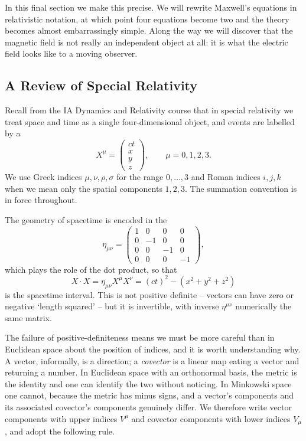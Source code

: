In this final section we make this precise. We will rewrite Maxwell's equations in relativistic notation, at which point four equations become two and the theory becomes almost embarrassingly simple. Along the way we will discover that the magnetic field is not really an independent object at all: it is what the electric field looks like to a moving observer.

\subsection{A Review of Special Relativity}

Recall from the IA Dynamics and Relativity course that in special relativity we treat space and time as a single four-dimensional object, and events are labelled by a 
$$
X^\mu = \begin{pmatrix} ct \\ x\\ y\\ z\end{pmatrix}, \qquad \mu = 0,1,2,3.
$$
We use Greek indices $\mu,\nu,\rho,\sigma$ for the range $0,\dots,3$ and Roman indices $i,j,k$ when we mean only the spatial components $1,2,3$. The summation convention is in force throughout.

The geometry of spacetime is encoded in the 
$$
\eta_{\mu\nu} = \begin{pmatrix} 1&0&0&0\\ 0&-1&0&0\\ 0&0&-1&0\\0&0&0&-1\end{pmatrix},
$$
which plays the role of the dot product, so that
$$
X\cdot X = \eta_{\mu\nu}X^\mu X^\nu = (ct)^2 - (x^2+y^2+z^2)
$$
is the spacetime interval. This is not positive definite -- vectors can have zero or negative `length squared' -- but it is invertible, with inverse $\eta^{\mu\nu}$ numerically the same matrix.

The failure of positive-definiteness means we must be more careful than in Euclidean space about the position of indices, and it is worth understanding why. A vector, informally, is a direction; a \emph{covector} is a linear map eating a vector and returning a number. In Euclidean space with an orthonormal basis, the metric is the identity and one can identify the two without noticing. In Minkowski space one cannot, because the metric has minus signs, and a vector's components and its associated covector's components genuinely differ. We therefore write vector components with upper indices $V^\mu$ and covector components with lower indices $V_\mu$, and adopt the following rule.

